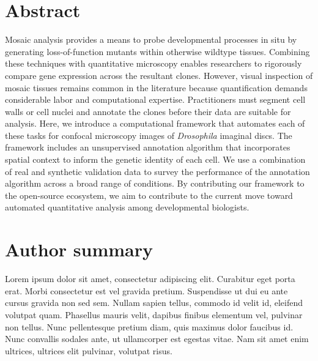 \documentclass[10pt,letterpaper]{article}
\begin{document}
\section*{Abstract}
Mosaic analysis provides a means to probe developmental processes in situ by generating loss-of-function mutants within otherwise wildtype tissues. Combining these techniques with quantitative microscopy enables researchers to rigorously compare gene expression across the resultant clones. However, visual inspection of mosaic tissues remains common in the literature because quantification demands considerable labor and computational expertise. Practitioners must segment cell walls or cell nuclei and annotate the clones before their data are suitable for analysis. Here, we introduce a computational framework that automates each of these tasks for confocal microscopy images of \textit{Drosophila} imaginal discs. The framework includes an unsupervised annotation algorithm that incorporates spatial context to inform the genetic identity of each cell. We use a combination of real and synthetic validation data to survey the performance of the annotation algorithm across a broad range of conditions. By contributing our framework to the open-source ecosystem, we aim to contribute to the current move toward automated quantitative analysis among developmental biologists.


\section*{Author summary}
Lorem ipsum dolor sit amet, consectetur adipiscing elit. Curabitur eget porta erat. Morbi consectetur est vel gravida pretium. Suspendisse ut dui eu ante cursus gravida non sed sem. Nullam sapien tellus, commodo id velit id, eleifend volutpat quam. Phasellus mauris velit, dapibus finibus elementum vel, pulvinar non tellus. Nunc pellentesque pretium diam, quis maximus dolor faucibus id. Nunc convallis sodales ante, ut ullamcorper est egestas vitae. Nam sit amet enim ultrices, ultrices elit pulvinar, volutpat risus.

\linenumbers




\end{document}
